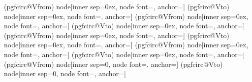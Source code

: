 {    \ifpgf@circuit@europeanvoltage
        \ifpgf@circuit@bipole@voltage@straight
            \ifpgf@circuit@bipole@voltage@backward
                (pgfcirc@Vfrom) node[inner sep=0ex, node font=\pgf@circ@avfont,
                    anchor=\pgf@circ@bipole@voltage@label@anchor]{\pgf@circ@avminus}
                (pgfcirc@Vto) node[inner sep=0ex, node font=\pgf@circ@avfont,
                    anchor=\pgf@circ@bipole@voltage@label@anchor]{\pgf@circ@avplus}
            \else
                (pgfcirc@Vfrom) node[inner sep=0ex, node font=\pgf@circ@avfont,
                    anchor=\pgf@circ@bipole@voltage@label@anchor]{\pgf@circ@avplus}
                (pgfcirc@Vto) node[inner sep=0ex, node font=\pgf@circ@avfont,
                    anchor=\pgf@circ@bipole@voltage@label@anchor]{\pgf@circ@avminus}
            \fi
            \else
            \ifpgf@circuit@bipole@voltage@backward
                (pgfcirc@Vfrom) node[inner sep=0ex, node font=\pgf@circ@avfont,
                    anchor=\pgf@circ@bipole@voltage@label@anchor]{\pgf@circ@avminus}
                (pgfcirc@Vto) node[inner sep=0ex, node font=\pgf@circ@avfont,
                    anchor=\pgf@circ@bipole@voltage@label@anchor]{\pgf@circ@avplus}
            \else
                (pgfcirc@Vfrom) node[inner sep=0ex, node font=\pgf@circ@avfont,
                    anchor=\pgf@circ@bipole@voltage@label@anchor]{\pgf@circ@avplus}
                (pgfcirc@Vto) node[inner sep=0ex, node font=\pgf@circ@avfont,
                    anchor=\pgf@circ@bipole@voltage@label@anchor]{\pgf@circ@avminus}
            \fi
        \fi
        \else
        \ifpgf@circuit@bipole@voltage@backward
            \ifpgf@circ@oldvoltagedirection
                (pgfcirc@Vfrom) node[inner sep=0, node font=\pgf@circ@avfont,
                    anchor=\pgf@circ@bipole@voltage@label@anchor]{\pgf@circ@avplus}
                (pgfcirc@Vto) node[inner sep=0, node font=\pgf@circ@avfont,
                    anchor=\pgf@circ@bipole@voltage@label@anchor]{\pgf@circ@avminus}
}
